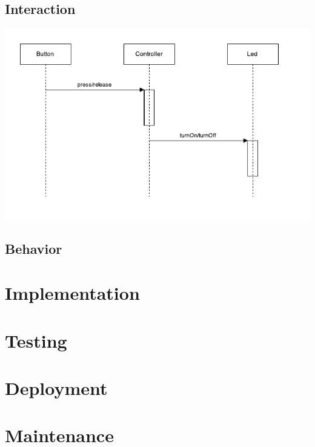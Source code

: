 \documentclass{llncs}
\newcommand{\labelsec}[1]{\label{sec:#1}}
\begin{document}
\subsection{Interaction}
\begin{center}
\includegraphics{img/graphs/Interaction.pdf}
\end{center}
\subsection{Behavior}
\section{Implementation}
\labelsec{Implementation}

\section{Testing}
\labelsec{testing}

\section{Deployment}
\labelsec{Deployment}

\section{Maintenance}
\labelsec{Maintenance}
\end{document}
